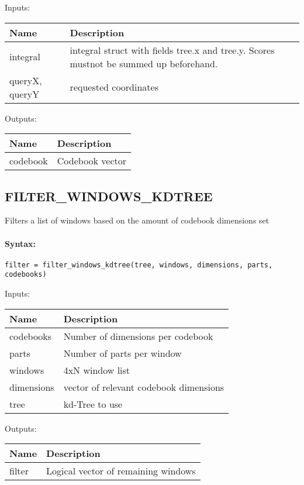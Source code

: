 \bigskip
Inputs:

\begin{tabular}{|p{}|p{}|}
\hline
\textbf{Name} & \textbf{Description} \\
\hline \hline
integral & integral struct with fields tree.x and tree.y. Scores mustnot be summed up beforehand.  \\ \hline
queryX, queryY & requested coordinates  \\ \hline
\end{tabular}

\bigskip
Outputs:

\begin{tabular}{|p{}|p{}|}
\hline
\textbf{Name} & \textbf{Description} \\
\hline \hline
codebook & Codebook vector  \\ \hline
\end{tabular}

\subsection{FILTER\_WINDOWS\_KDTREE}

Filters a list of windows based on the amount of codebook dimensions set

\paragraph{Syntax:} \verb|filter = filter_windows_kdtree(tree, windows, dimensions, parts, codebooks)|

\bigskip
Inputs:

\begin{tabular}{|p{}|p{}|}
\hline
\textbf{Name} & \textbf{Description} \\
\hline \hline
codebooks & Number of dimensions per codebook  \\ \hline
parts & Number of parts per window  \\ \hline
windows & 4xN window list  \\ \hline
dimensions & vector of relevant codebook dimensions  \\ \hline
tree & kd-Tree to use  \\ \hline
\end{tabular}

\bigskip
Outputs:

\begin{tabular}{|p{}|p{}|}
\hline
\textbf{Name} & \textbf{Description} \\
\hline \hline
filter & Logical vector of remaining windows  \\ \hline
\end{tabular}

